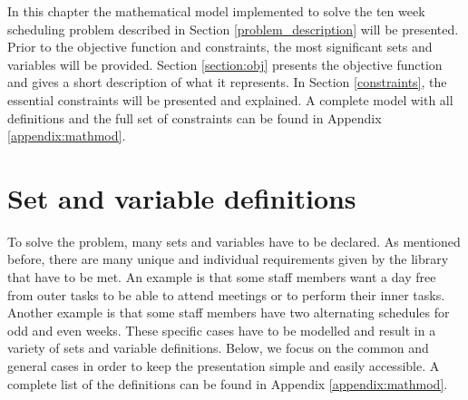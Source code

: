 In this chapter the mathematical model implemented to solve the ten week scheduling problem described in Section \ref{problem_description} will be presented. Prior to the objective function and constraints, the most significant sets and variables will be provided. Section \ref{section:obj} presents the objective function and gives a short description of what it represents. In Section \ref{constraints}, the essential constraints will be presented and explained. A complete model with all definitions and the full set of constraints can be found in Appendix \ref{appendix:mathmod}. %
\section{Set and variable definitions} \label{variables}
To solve the problem, many sets and variables have to be declared. As mentioned before, there are many unique and individual requirements given by the library that have to be met. An example is that some staff members want a day free from outer tasks to be able to attend meetings or to perform their inner tasks. Another example is that some staff members have two alternating schedules for odd and even weeks. These specific cases have to be modelled and result in a variety of sets and variable definitions. Below, we focus on the common and general cases in order to keep the presentation simple and easily accessible. A complete list of the definitions can be found in Appendix \ref{appendix:mathmod}. \\
 \\
  \\
	 	\\
	 	\\
                  \\
	 \\
                            \\
	 \\
                    \\
                \\
               \\
	 	\\
	 	\\

